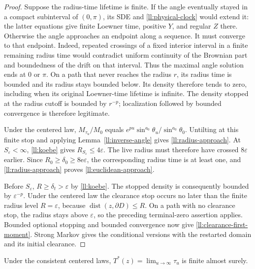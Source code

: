 \begin{proof}
Suppose the radius-time lifetime is finite.  If the angle eventually
stayed in a compact subinterval of $(0,\pi)$, its SDE and
\eqref{ll:physical-clock} would extend it: the latter equations give
finite Loewner time, positive $Y$, and regular $Z$ there.  Otherwise
the angle approaches an endpoint along a sequence.  It must converge
to that endpoint.  Indeed, repeated crossings of a fixed interior
interval in a finite remaining radius time would contradict uniform
continuity of the Brownian part and boundedness of the drift on that
interval.  Thus the maximal angle solution ends at $0$ or $\pi$.
On a path that never reaches the radius $r$, its radius time is bounded
and its radius stays bounded below.  Its density therefore tends to zero,
including when its original Loewner-time lifetime is infinite.
The density stopped at the radius cutoff is bounded by $r^{-p}$;
localization followed by bounded convergence is therefore legitimate.

Under the centered law, $M_{\tau_u}/M_0$
equals $e^{pu}\sin^{a_0}\theta_u/\sin^{a_0}\theta_0$.
Untilting at this finite stop and applying
Lemma~\ref{ll:inverse-angle} gives \eqref{ll:radius-approach}.
At $S_\varepsilon<\infty$, \eqref{ll:koebe} gives
$R_{S_\varepsilon}\le4\varepsilon$.  The live radius must therefore
have crossed $8\varepsilon$ earlier.  Since
$R_0\ge\delta_0\ge8\mathrm e\varepsilon$, the corresponding radius
time is at least one, and \eqref{ll:radius-approach} proves
\eqref{ll:euclidean-approach}.

Before $S_\varepsilon$, $R\ge\delta_t>\varepsilon$
by \eqref{ll:koebe}. The stopped density is consequently bounded by
$\varepsilon^{-p}$.
Under the centered law the clearance stop occurs no later than the
finite radius level $R=\varepsilon$, because
$\operatorname{dist}(z,\partial D)\le R$.
On a path with no clearance stop, the radius stays above
$\varepsilon$, so the preceding terminal-zero assertion applies.
Bounded optional stopping and bounded convergence now give
\eqref{ll:clearance-first-moment}.  Strong Markov gives the conditional
versions with the restarted domain and its initial clearance.
\end{proof}

\begin{lemma}\label{ll:finite-clock}
Under the consistent centered laws, $T^*(z)=\lim_{u\to\infty}\tau_u$
is finite almost surely.
\end{lemma}

